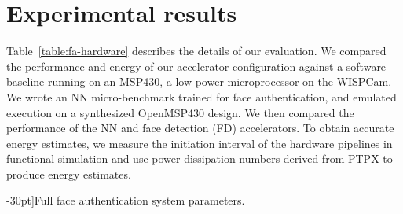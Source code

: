 
\section{Experimental results}
Table~\ref{table:fa-hardware} describes the details of our evaluation. We compared the performance and energy of our accelerator configuration against a software baseline running on an MSP430, a low-power microprocessor on the WISPCam. We wrote an NN micro-benchmark trained for face authentication, and emulated execution on a synthesized OpenMSP430 design. We then compared the performance of the NN and face detection (FD) accelerators. To obtain accurate energy estimates, we measure the initiation interval of the hardware pipelines in functional simulation
and use power dissipation numbers derived from PTPX to produce energy estimates.


\begin{table}[h]
  \caption[][-30pt]{Full face authentication system parameters.}
  \label{table:fa-hardware}

\end{table}

